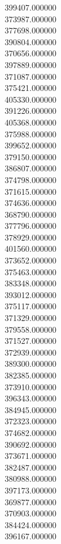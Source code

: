 399407.000000\\
373987.000000\\
377698.000000\\
390804.000000\\
370656.000000\\
397889.000000\\
371087.000000\\
375421.000000\\
405330.000000\\
391226.000000\\
405368.000000\\
375988.000000\\
399652.000000\\
379150.000000\\
386807.000000\\
374798.000000\\
371615.000000\\
374636.000000\\
368790.000000\\
377796.000000\\
378929.000000\\
401560.000000\\
373652.000000\\
375463.000000\\
383348.000000\\
393012.000000\\
375117.000000\\
371329.000000\\
379558.000000\\
371527.000000\\
372939.000000\\
389300.000000\\
382385.000000\\
373910.000000\\
396343.000000\\
384945.000000\\
372323.000000\\
374682.000000\\
390692.000000\\
373671.000000\\
382487.000000\\
380988.000000\\
397173.000000\\
369877.000000\\
370903.000000\\
384424.000000\\
396167.000000\\
